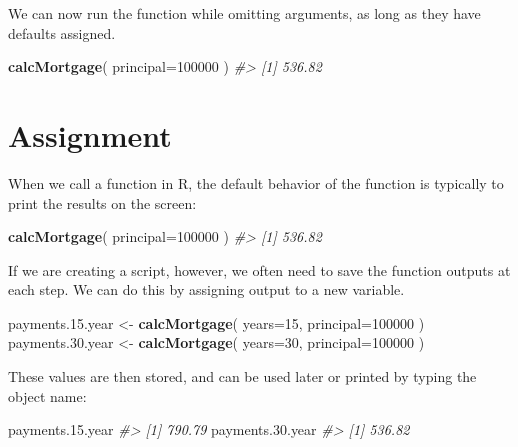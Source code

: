 \documentclass[]{book}
\newenvironment{Shaded}{\begin{snugshade}}{\end{snugshade}}
\newcommand{\CommentTok}[1]{\textcolor[rgb]{0.56,0.35,0.01}{\textit{#1}}}
\newcommand{\DataTypeTok}[1]{\textcolor[rgb]{0.13,0.29,0.53}{#1}}
\newcommand{\DecValTok}[1]{\textcolor[rgb]{0.00,0.00,0.81}{#1}}
\newcommand{\FloatTok}[1]{\textcolor[rgb]{0.00,0.00,0.81}{#1}}
\newcommand{\KeywordTok}[1]{\textcolor[rgb]{0.13,0.29,0.53}{\textbf{#1}}}
\newcommand{\NormalTok}[1]{#1}
\newcommand{\StringTok}[1]{\textcolor[rgb]{0.31,0.60,0.02}{#1}}
\theoremstyle{definition}
\theoremstyle{definition}
\theoremstyle{definition}
\theoremstyle{remark}
\begin{document}
We can now run the function while omitting arguments, as long as they
have defaults assigned.

\begin{Shaded}
\begin{Highlighting}[]
\KeywordTok{calcMortgage}\NormalTok{( }\DataTypeTok{principal=}\DecValTok{100000}\NormalTok{  )}
\CommentTok{#> [1] 536.82}
\end{Highlighting}
\end{Shaded}

\hypertarget{assignment}{%
\section{Assignment}\label{assignment}}

When we call a function in R, the default behavior of the function is
typically to print the results on the screen:

\begin{Shaded}
\begin{Highlighting}[]
\KeywordTok{calcMortgage}\NormalTok{( }\DataTypeTok{principal=}\DecValTok{100000}\NormalTok{  )}
\CommentTok{#> [1] 536.82}
\end{Highlighting}
\end{Shaded}

If we are creating a script, however, we often need to save the function
outputs at each step. We can do this by assigning output to a new
variable.

\begin{Shaded}
\begin{Highlighting}[]
\NormalTok{payments.}\FloatTok{15.}\NormalTok{year <-}\StringTok{ }\KeywordTok{calcMortgage}\NormalTok{( }\DataTypeTok{years=}\DecValTok{15}\NormalTok{, }\DataTypeTok{principal=}\DecValTok{100000}\NormalTok{  )}
\NormalTok{payments.}\FloatTok{30.}\NormalTok{year <-}\StringTok{ }\KeywordTok{calcMortgage}\NormalTok{( }\DataTypeTok{years=}\DecValTok{30}\NormalTok{, }\DataTypeTok{principal=}\DecValTok{100000}\NormalTok{  )}
\end{Highlighting}
\end{Shaded}

These values are then stored, and can be used later or printed by typing
the object name:

\begin{Shaded}
\begin{Highlighting}[]
\NormalTok{payments.}\FloatTok{15.}\NormalTok{year}
\CommentTok{#> [1] 790.79}
\NormalTok{payments.}\FloatTok{30.}\NormalTok{year}
\CommentTok{#> [1] 536.82}
\end{Highlighting}
\end{Shaded}
\end{document}
